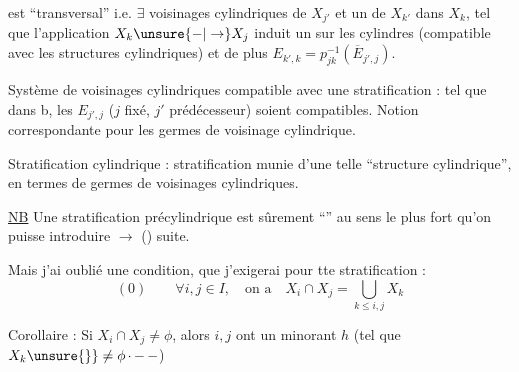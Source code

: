 est ``transversal'' i.e.  $\exists$ voisinages cylindriques
de $X_{j'}$  et un de $X_{k'}$ dans $X_k$, tel que l'application
$X_k\unsure{-|\to}X_j$ induit un  sur les
cylindres (compatible avec les structures
cylindriques) et de plus
$E_{k',k}=p_{jk}^{-1}(\overline E_{j',j})$.

Système de voisinages cylindriques 
compatible avec une stratification : tel que
dans b, les $E_{j',j}$ ($j$ fixé, $j'$ prédécesseur)
soient compatibles. Notion correspondante
pour les germes de voisinage cylindrique.

Stratification cylindrique : stratification munie
d'une telle ``structure cylindrique'', en
termes de germes de voisinages cylindriques.

\uline{NB} Une stratification précylindrique 
est sûrement
``'' au sens le plus fort qu'on
puisse introduire $\to$ () suite.

Mais j'ai oublié une condition, que j'exigerai
pour tte stratification :
\[
(0)\qquad \forall i,j\in I,\quad\text{on a}\quad
X_i\cap X_j=\bigcup_{k\le i,j}X_k
\]

Corollaire : Si $X_i\cap X_j\ne\phi$, alors $i,j$ ont un
minorant $h$ (tel que  $X_k\unsure{\}}\ne\phi$\(\mathinner{\cdotp-\, -}\))
